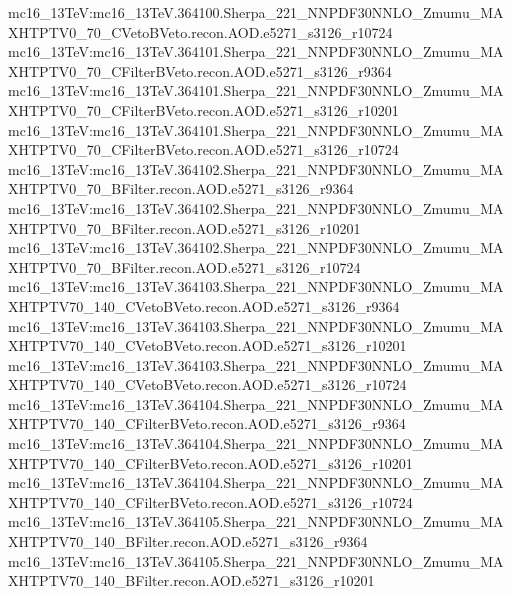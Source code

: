 { mc16\_13TeV:mc16\_13TeV.364100.Sherpa\_221\_NNPDF30NNLO\_Zmumu\_MAXHTPTV0\_70\_CVetoBVeto.recon.AOD.e5271\_s3126\_r10724 \newline    
 mc16\_13TeV:mc16\_13TeV.364101.Sherpa\_221\_NNPDF30NNLO\_Zmumu\_MAXHTPTV0\_70\_CFilterBVeto.recon.AOD.e5271\_s3126\_r9364  \newline   
 mc16\_13TeV:mc16\_13TeV.364101.Sherpa\_221\_NNPDF30NNLO\_Zmumu\_MAXHTPTV0\_70\_CFilterBVeto.recon.AOD.e5271\_s3126\_r10201 \newline    
 mc16\_13TeV:mc16\_13TeV.364101.Sherpa\_221\_NNPDF30NNLO\_Zmumu\_MAXHTPTV0\_70\_CFilterBVeto.recon.AOD.e5271\_s3126\_r10724 \newline    
 mc16\_13TeV:mc16\_13TeV.364102.Sherpa\_221\_NNPDF30NNLO\_Zmumu\_MAXHTPTV0\_70\_BFilter.recon.AOD.e5271\_s3126\_r9364 \newline   
 mc16\_13TeV:mc16\_13TeV.364102.Sherpa\_221\_NNPDF30NNLO\_Zmumu\_MAXHTPTV0\_70\_BFilter.recon.AOD.e5271\_s3126\_r10201 \newline    
 mc16\_13TeV:mc16\_13TeV.364102.Sherpa\_221\_NNPDF30NNLO\_Zmumu\_MAXHTPTV0\_70\_BFilter.recon.AOD.e5271\_s3126\_r10724 \newline    
 mc16\_13TeV:mc16\_13TeV.364103.Sherpa\_221\_NNPDF30NNLO\_Zmumu\_MAXHTPTV70\_140\_CVetoBVeto.recon.AOD.e5271\_s3126\_r9364  \newline   
 mc16\_13TeV:mc16\_13TeV.364103.Sherpa\_221\_NNPDF30NNLO\_Zmumu\_MAXHTPTV70\_140\_CVetoBVeto.recon.AOD.e5271\_s3126\_r10201  \newline   
 mc16\_13TeV:mc16\_13TeV.364103.Sherpa\_221\_NNPDF30NNLO\_Zmumu\_MAXHTPTV70\_140\_CVetoBVeto.recon.AOD.e5271\_s3126\_r10724 \newline    
 mc16\_13TeV:mc16\_13TeV.364104.Sherpa\_221\_NNPDF30NNLO\_Zmumu\_MAXHTPTV70\_140\_CFilterBVeto.recon.AOD.e5271\_s3126\_r9364  \newline   
 mc16\_13TeV:mc16\_13TeV.364104.Sherpa\_221\_NNPDF30NNLO\_Zmumu\_MAXHTPTV70\_140\_CFilterBVeto.recon.AOD.e5271\_s3126\_r10201 \newline    
 mc16\_13TeV:mc16\_13TeV.364104.Sherpa\_221\_NNPDF30NNLO\_Zmumu\_MAXHTPTV70\_140\_CFilterBVeto.recon.AOD.e5271\_s3126\_r10724  \newline   
 mc16\_13TeV:mc16\_13TeV.364105.Sherpa\_221\_NNPDF30NNLO\_Zmumu\_MAXHTPTV70\_140\_BFilter.recon.AOD.e5271\_s3126\_r9364 \newline    
 mc16\_13TeV:mc16\_13TeV.364105.Sherpa\_221\_NNPDF30NNLO\_Zmumu\_MAXHTPTV70\_140\_BFilter.recon.AOD.e5271\_s3126\_r10201 \newline    
}

